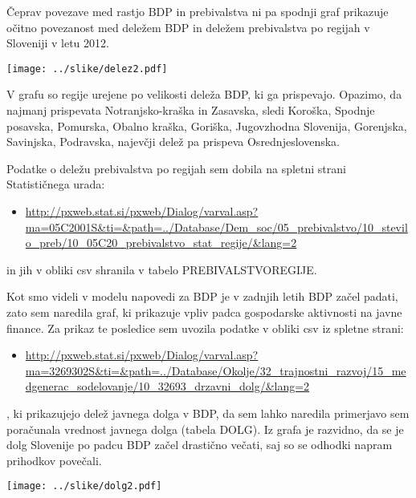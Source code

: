 \documentclass[a4paper, 11pt]{article}
\begin{document}
Čeprav povezave med rastjo BDP in prebivalstva ni pa spodnji graf prikazuje očitno povezanost med deležem BDP in deležem prebivalstva po regijah v Sloveniji v letu 2012. 


\begin{center}
\texttt{[image: ../slike/delez2.pdf]}
\end{center}
V grafu so regije urejene po velikosti deleža BDP, ki ga prispevajo. Opazimo, da najmanj prispevata Notranjsko-kraška in  Zasavska, sledi Koroška, Spodnje posavska, Pomurska, Obalno kraška, Goriška, Jugovzhodna Slovenija, Gorenjska, Savinjska, Podravska, najevčji delež pa prispeva   Osrednjeslovenska.

Podatke o deležu prebivalstva po regijah sem dobila na spletni strani Statističnega urada:
\begin{itemize}
\item{\url{http://pxweb.stat.si/pxweb/Dialog/varval.asp?ma=05C2001S&ti=&path=../Database/Dem_soc/05_prebivalstvo/10_stevilo_preb/10_05C20_prebivalstvo_stat_regije/&lang=2}} 
\end{itemize}
in jih v obliki csv shranila v tabelo PREBIVALSTVOREGIJE.

Kot smo videli v modelu napovedi za BDP je v zadnjih letih BDP začel padati, zato sem naredila graf, ki prikazuje vpliv padca gospodarske aktivnosti na javne finance.
Za prikaz te posledice sem uvozila podatke v obliki csv iz spletne strani:
\begin{itemize}
\item{\url{http://pxweb.stat.si/pxweb/Dialog/varval.asp?ma=3269302S&ti=&path=../Database/Okolje/32_trajnostni_razvoj/15_medgenerac_sodelovanje/10_32693_drzavni_dolg/&lang=2}}
\end{itemize}
, ki prikazujejo delež javnega dolga v BDP, da sem lahko naredila primerjavo sem poračunala vrednost javnega dolga (tabela DOLG).
Iz grafa je razvidno, da se je dolg Slovenije po padcu BDP začel drastično večati, saj so se odhodki napram prihodkov povečali.

\begin{center}
\texttt{[image: ../slike/dolg2.pdf]}
\end{center}


\newpage
\end{document}
